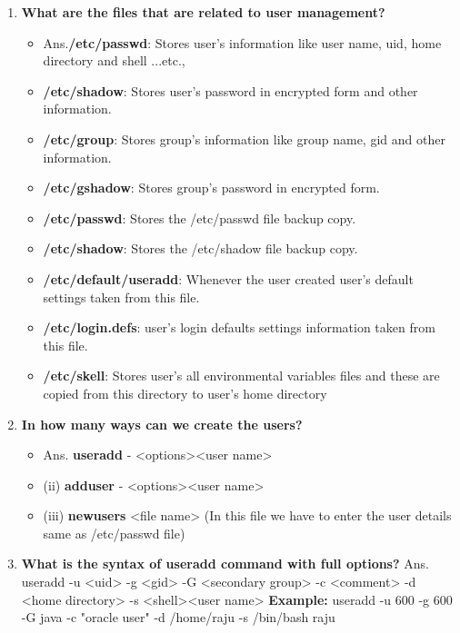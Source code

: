 \begin{enumerate}
    \bigskip
    \bigskip

    \item\textbf {What are the files that are related to user management?}
    \begin {itemize}
	    \item Ans.\textbf{/etc/passwd}: Stores user's information like user name, uid, home directory and shell ...etc.,
	    \item \textbf{/etc/shadow}: Stores user's password in encrypted form and other information.
	    \item \textbf{/etc/group}: Stores group's information like group name, gid and other information.
	    \item \textbf{/etc/gshadow}: Stores group's password in encrypted form.
	    \item \textbf{/etc/passwd}: Stores the  /etc/passwd   file backup copy.
	    \item \textbf{/etc/shadow}: Stores the /etc/shadow  file backup copy.
	    \item \textbf{/etc/default/useradd}: Whenever the user created user's default settings taken from this file.
	    \item \textbf{/etc/login.defs}: user's login defaults settings information taken from this file.
	    \item \textbf{/etc/skell}: Stores user's all environmental variables files and these are copied from this directory to user's home directory
    \end{itemize}

    \bigskip
    \bigskip

    \item \textbf {In how many ways can we create the users?}
    \begin{itemize}
	    \item Ans. \textbf{useradd} - <options><user name>
	    \item (ii)  \textbf{adduser}    - <options><user name>
	    \item (iii) \textbf{newusers}    <file name>   (In this file we have to enter the user details same as /etc/passwd   file)
    \end{itemize}

    \bigskip
    \bigskip

    \item\textbf{What is the syntax of useradd command with full options?}
    \newline
     Ans. useradd  -u <uid>  -g <gid>  -G <secondary group> -c  <comment>  -d <home 
        directory> -s <shell><user name> 
        \newline
        \textbf{Example:} useradd  -u  600  -g  600  -G  java   -c  "oracle user"   -d  /home/raju   -s /bin/bash raju


\end{enumerate}
